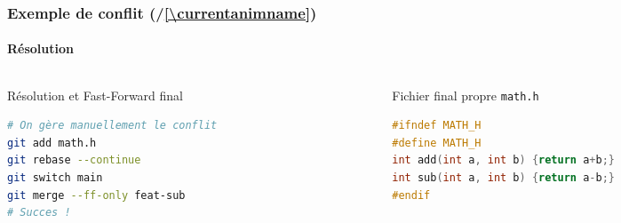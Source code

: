 \documentclass[
	11pt,
	aspectratio=169
]{beamer}
\makeatletter
\newcounter{animstep}
\newcommand{\stepanim}{%
    \stepcounter{animstep}%
    (\theanimstep/\ref*{\currentanimname})%
}
\newcommand{\stopanim}{%
    \edef\@currentlabel{\the\value{animstep}}%
    \label{\currentanimname}%
}
\makeatother
\begin{document}
\begin{frame}[fragile]
    \frametitle{Exemple de conflit \stepanim\stopanim}
    \framesubtitle{Résolution}

    \begin{center}
    \end{center}
    \vspace{-0.3cm}

    \begin{columns}[t]
        \begin{column}{0.48\textwidth}
            \begin{block}{\scriptsize Résolution et Fast-Forward final}
\begin{lstlisting}[language=bash]
# On gère manuellement le conflit
git add math.h
git rebase --continue
git switch main
git merge --ff-only feat-sub
# Succes !
\end{lstlisting}
            \end{block}
        \end{column}
        \begin{column}{0.48\textwidth}
            \begin{exampleblock}{\scriptsize Fichier final propre \texttt{math.h}}
\begin{lstlisting}[language=C]
#ifndef MATH_H
#define MATH_H
int add(int a, int b) {return a+b;}
int sub(int a, int b) {return a-b;}
#endif
\end{lstlisting}
            \end{exampleblock}
        \end{column}
    \end{columns}
\end{frame}
\end{document}
